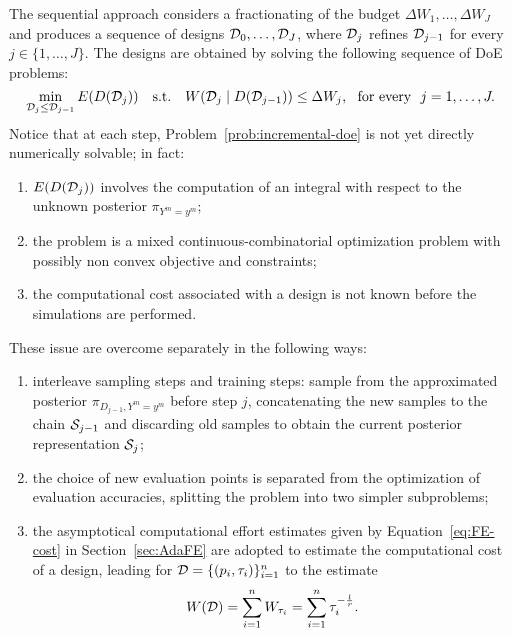 The sequential approach considers a fractionating of the budget $\Delta W_1, \dots, \Delta W_J$ and produces a sequence of designs $\mathcal D_0,\dots, \mathcal D_J$, where $\mathcal D_j$ refines $\mathcal D_{j-1}$ for every $j \in \{1,\dots, J\}$.
The designs are obtained by solving the following sequence of DoE problems:
\begin{equation} \label{prob:incremental-doe}
    \min_{\mathcal D_{j} \le \mathcal D_{j-1}} E(D(\mathcal D_{j})) \quad \text{s.t.} 
    \quad W(\mathcal D_{j} \mid D(\mathcal D_{j-1}) ) \le \Delta W_j, \ \text{ for every } \ j=1,\dots,J.
\end{equation} 
Notice that at each step, Problem~\eqref{prob:incremental-doe} is not yet directly numerically solvable; in fact:
\begin{enumerate}[label=\textbf{\arabic*}]    
    \item $E(D(\mathcal D_{j}))$ involves the computation of an integral with respect to the unknown posterior $\pi_{Y^m = y^m}$;
    \item the problem is a mixed continuous-combinatorial optimization problem with possibly non convex objective and constraints;
    \item the computational cost associated with a design is not known before the simulations are performed.
\end{enumerate}
These issue are overcome separately in the following ways:
\begin{enumerate}[label=\textbf{\arabic*}]
    \item interleave sampling steps and training steps: sample from the approximated posterior $\pi_{D_{j-1}, Y^m = y^m}$ before step $j$, concatenating the new samples to the chain $\mathcal S_{j-1}$ and discarding old samples to obtain the current posterior representation $\mathcal S_j$;
    \item the choice of new evaluation points is separated from the optimization of evaluation accuracies, splitting the problem into two simpler subproblems;
    \item the asymptotical computational effort estimates given by Equation~\eqref{eq:FE-cost} in Section~\ref{sec:AdaFE} are adopted to estimate the computational cost of a design, leading for $\mathcal D = \{ (p_i, \tau_i) \}_{i=1}^n$ to the estimate
    \begin{equation} \label{eq:comp-cost}
        W(\mathcal D) = \sum_{i=1}^n W_{\tau_i} = \sum_{i=1}^n \tau_i^{- \frac{l}{r}}.
    \end{equation}
\end{enumerate}

